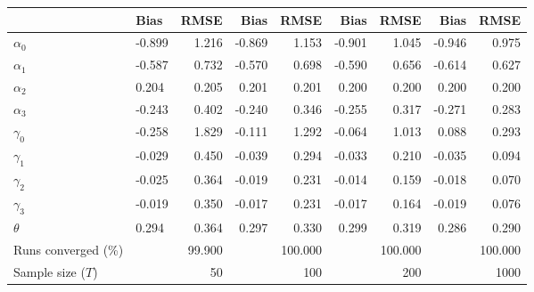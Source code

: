
\begin{tabular}[t]{llrrrrrrr}
\toprule
  & Bias & RMSE & Bias & RMSE & Bias & RMSE & Bias & RMSE\\
\midrule
$\alpha_{0}$ & -0.899 & 1.216 & -0.869 & 1.153 & -0.901 & 1.045 & -0.946 & 0.975\\
$\alpha_{1}$ & -0.587 & 0.732 & -0.570 & 0.698 & -0.590 & 0.656 & -0.614 & 0.627\\
$\alpha_{2}$ & 0.204 & 0.205 & 0.201 & 0.201 & 0.200 & 0.200 & 0.200 & 0.200\\
$\alpha_{3}$ & -0.243 & 0.402 & -0.240 & 0.346 & -0.255 & 0.317 & -0.271 & 0.283\\
$\gamma_{0}$ & -0.258 & 1.829 & -0.111 & 1.292 & -0.064 & 1.013 & 0.088 & 0.293\\
$\gamma_{1}$ & -0.029 & 0.450 & -0.039 & 0.294 & -0.033 & 0.210 & -0.035 & 0.094\\
$\gamma_{2}$ & -0.025 & 0.364 & -0.019 & 0.231 & -0.014 & 0.159 & -0.018 & 0.070\\
$\gamma_{3}$ & -0.019 & 0.350 & -0.017 & 0.231 & -0.017 & 0.164 & -0.019 & 0.076\\
$\theta$ & 0.294 & 0.364 & 0.297 & 0.330 & 0.299 & 0.319 & 0.286 & 0.290\\
Runs converged (\%) &  & 99.900 &  & 100.000 &  & 100.000 &  & 100.000\\
Sample size ($T$) &  & 50 &  & 100 &  & 200 &  & 1000\\
\bottomrule
\end{tabular}
